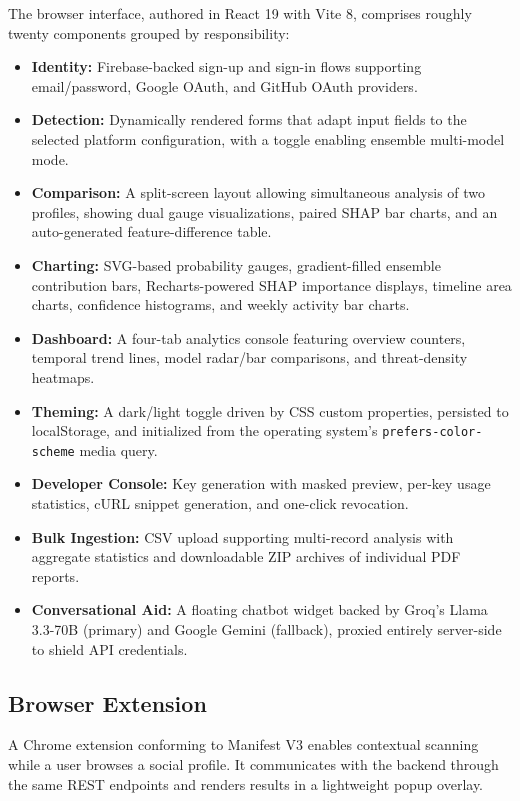\documentclass[conference]{IEEEtran}
\begin{document}
The browser interface, authored in React 19 with Vite 8, comprises roughly twenty components grouped by responsibility:

\begin{itemize}
    \item \textbf{Identity:} Firebase-backed sign-up and sign-in flows supporting email/password, Google OAuth, and GitHub OAuth providers.
    \item \textbf{Detection:} Dynamically rendered forms that adapt input fields to the selected platform configuration, with a toggle enabling ensemble multi-model mode.
    \item \textbf{Comparison:} A split-screen layout allowing simultaneous analysis of two profiles, showing dual gauge visualizations, paired SHAP bar charts, and an auto-generated feature-difference table.
    \item \textbf{Charting:} SVG-based probability gauges, gradient-filled ensemble contribution bars, Recharts-powered SHAP importance displays, timeline area charts, confidence histograms, and weekly activity bar charts.
    \item \textbf{Dashboard:} A four-tab analytics console featuring overview counters, temporal trend lines, model radar/bar comparisons, and threat-density heatmaps.
    \item \textbf{Theming:} A dark/light toggle driven by CSS custom properties, persisted to localStorage, and initialized from the operating system's \texttt{prefers-color-scheme} media query.
    \item \textbf{Developer Console:} Key generation with masked preview, per-key usage statistics, cURL snippet generation, and one-click revocation.
    \item \textbf{Bulk Ingestion:} CSV upload supporting multi-record analysis with aggregate statistics and downloadable ZIP archives of individual PDF reports.
    \item \textbf{Conversational Aid:} A floating chatbot widget backed by Groq's Llama 3.3-70B (primary) and Google Gemini (fallback), proxied entirely server-side to shield API credentials.
\end{itemize}

\subsection{Browser Extension}

A Chrome extension conforming to Manifest V3 enables contextual scanning while a user browses a social profile. It communicates with the backend through the same REST endpoints and renders results in a lightweight popup overlay.
\end{document}
